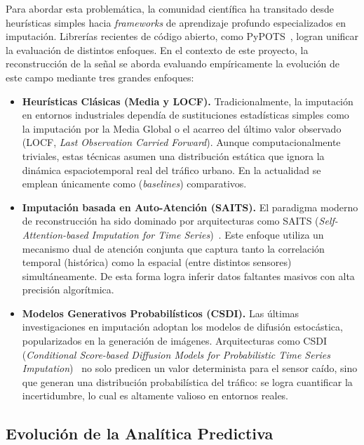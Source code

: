 Para abordar esta problemática, la comunidad científica ha transitado desde heurísticas simples hacia \textit{frameworks} de aprendizaje profundo especializados en imputación. Librerías recientes de código abierto, como PyPOTS~\cite{du2023pypots}, logran unificar la evaluación de distintos enfoques. En el contexto de este proyecto, la reconstrucción de la señal se aborda evaluando empíricamente la evolución de este campo mediante tres grandes enfoques:

\begin{itemize}
	\item \textbf{Heurísticas Clásicas (Media y LOCF).} Tradicionalmente, la imputación en entornos industriales dependía de sustituciones estadísticas simples como la imputación por la Media Global o el acarreo del último valor observado (LOCF, \textit{Last Observation Carried Forward}). Aunque computacionalmente triviales, estas técnicas asumen una distribución estática que ignora la dinámica espaciotemporal real del tráfico urbano. En la actualidad se emplean únicamente como (\textit{baselines}) comparativos.
	
	\item \textbf{Imputación basada en Auto-Atención (SAITS).} El paradigma moderno de reconstrucción ha sido dominado por arquitecturas como SAITS (\textit{Self-Attention-based Imputation for Time Series})~\cite{du2023saits}. Este enfoque utiliza un mecanismo dual de atención conjunta que captura tanto la correlación temporal (histórica) como la espacial (entre distintos sensores) simultáneamente. De esta forma logra inferir datos faltantes masivos con alta precisión algorítmica.
	
	\item \textbf{Modelos Generativos Probabilísticos (CSDI).} Las últimas investigaciones en imputación adoptan los modelos de difusión estocástica, popularizados en la generación de imágenes. Arquitecturas como CSDI (\textit{Conditional Score-based Diffusion Models for Probabilistic Time Series Imputation})~\cite{tashiro2021csdi} no solo predicen un valor determinista para el sensor caído, sino que generan una distribución probabilística del tráfico: se logra cuantificar la incertidumbre, lo cual es altamente valioso en entornos reales.
\end{itemize}

\subsection{Evolución de la Analítica Predictiva}
\label{subsec:estado_forecasting}

